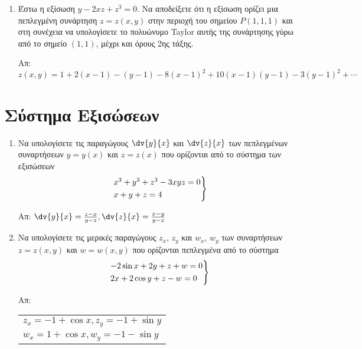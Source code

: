 \documentclass[a4paper,table]{report}
\begin{document}
\begin{enumerate}
    \item Έστω η εξίσωση $ y - 2xz + z^{3} = 0 $. Να αποδείξετε ότι η εξίσωση 
        ορίζει μια πεπλεγμένη συνάρτηση $ z = z(x,y) $ στην περιοχή του σημείου 
        $ P(1,1,1) $ και στη συνέχεια να υπολογίσετε το πολυώνυμο Taylor αυτής 
        της συνάρτησης γύρω από το σημείο $ (1,1) $, μέχρι και όρους 2ης τάξης. 

        \hfill Απ: $ z(x,y) =  1 + 2(x-1) - (y-1) - 8(x-1)^{2} + 10(x-1)(y-1) - 
        3(y-1)^{2} + \cdots $ 

\end{enumerate}


\section*{Σύστημα Εξισώσεων}

\begin{enumerate}


  \item Να υπολογίσετε τις παραγώγους $ \dv{y}{x} $ και $ \dv{z}{x}$ των πεπλεγμένων 
    συναρτήσεων $ y=y(x) $ και $ z=z(x) $ που ορίζονται από το σύστημα των εξισώσεων
    \[
      \begin{rcases}
        x^{3} + y^{3} + z^{3} -3xyz = 0 \\
        x+y+z=4 
      \end{rcases}
    \]

    \hfill Απ: $ \dv{y}{x} = \frac{ z-x }{ y-z }, \dv{z}{x} = \frac{ x-y }{ y-z } $ 

  \item Να υπολογίσετε τις μερικές παραγώγους $ z_{x}$, $ z_{y} $ και $ w_{x} $, 
    $ w_{y} $ των συναρτήσεων $ z = z(x,y) $ και $ w = w(x,y) $ που ορίζονται 
    πεπλεγμένα από το σύστημα 
    \[
      \begin{rcases}
        -2 \sin{x} + 2y + z + w = 0  \\
        2x + 2 \cos{y} + z - w = 0 
      \end{rcases} 
    \]

    \hfill Απ: \begin{tabular}{l}
      $ z_{x} = -1 + \cos{x}, z_{y} = -1 + \sin{y} $ \\
      $ w_{x} = 1 + \cos{x}, w_{y} = -1 - \sin{y}  $ 
    \end{tabular}

\end{enumerate}
\end{document}
